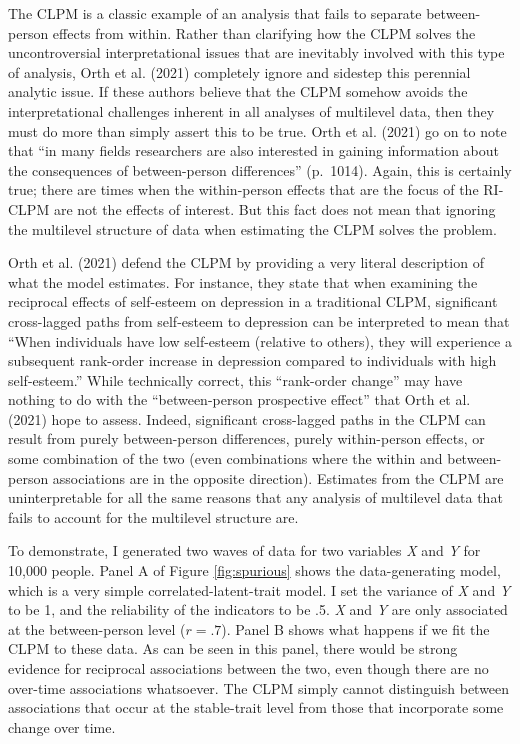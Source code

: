 \documentclass[
  english,
  man,floatsintext]{apa6}
\begin{document}
The CLPM is a classic example of an analysis that fails to separate between-person effects from within. Rather than clarifying how the CLPM solves the uncontroversial interpretational issues that are inevitably involved with this type of analysis, Orth et al. (2021) completely ignore and sidestep this perennial analytic issue. If these authors believe that the CLPM somehow avoids the interpretational challenges inherent in all analyses of multilevel data, then they must do more than simply assert this to be true. Orth et al. (2021) go on to note that ``in many fields researchers are also interested in gaining information about the consequences of between-person differences'' (p.~1014). Again, this is certainly true; there are times when the within-person effects that are the focus of the RI-CLPM are not the effects of interest. But this fact does not mean that ignoring the multilevel structure of data when estimating the CLPM solves the problem.

Orth et al. (2021) defend the CLPM by providing a very literal description of what the model estimates. For instance, they state that when examining the reciprocal effects of self-esteem on depression in a traditional CLPM, significant cross-lagged paths from self-esteem to depression can be interpreted to mean that ``When individuals have low self-esteem (relative to others), they will experience a subsequent rank-order increase in depression compared to individuals with high self-esteem.'' While technically correct, this ``rank-order change'' may have nothing to do with the ``between-person prospective effect'' that Orth et al. (2021) hope to assess. Indeed, significant cross-lagged paths in the CLPM can result from purely between-person differences, purely within-person effects, or some combination of the two (even combinations where the within and between-person associations are in the opposite direction). Estimates from the CLPM are uninterpretable for all the same reasons that any analysis of multilevel data that fails to account for the multilevel structure are.

To demonstrate, I generated two waves of data for two variables \emph{X} and \emph{Y} for 10,000 people. Panel A of Figure \ref{fig:spurious} shows the data-generating model, which is a very simple correlated-latent-trait model. I set the variance of \emph{X} and \emph{Y} to be 1, and the reliability of the indicators to be .5. \emph{X} and \emph{Y} are only associated at the between-person level (\(r = .7\)). Panel B shows what happens if we fit the CLPM to these data. As can be seen in this panel, there would be strong evidence for reciprocal associations between the two, even though there are no over-time associations whatsoever. The CLPM simply cannot distinguish between associations that occur at the stable-trait level from those that incorporate some change over time.
\end{document}
